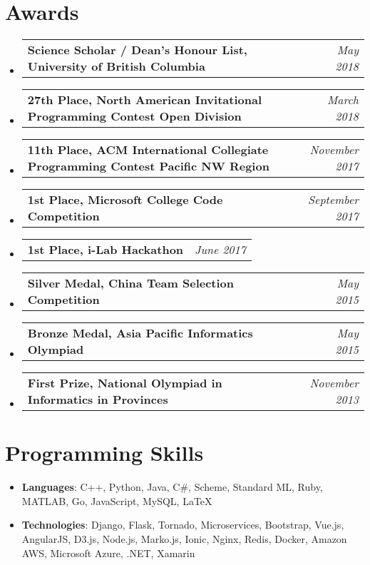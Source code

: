 \documentclass[letterpaper,11pt]{article}
\makeatletter
\newcommand{\resumeItem}[2]{
  \item\small{
    \textbf{#1}{: #2 \vspace{-2pt}}
  }
}
\newcommand{\awardSubItem}[2]{
  \item
    \begin{tabular*}{0.97\textwidth}{l@{\extracolsep{\fill}}r}
      \textbf{\small #1} & \textit{\small #2} \\
    \end{tabular*}\vspace{-8pt}
}
\newcommand{\resumeSubItem}[2]{\resumeItem{#1}{#2}\vspace{-4pt}}
\newcommand{\resumeSubHeadingListStart}{\begin{itemize}[leftmargin=*]}
\newcommand{\resumeSubHeadingListEnd}{\end{itemize}}
\makeatother
\begin{document}
\section{Awards}
  \resumeSubHeadingListStart
    \awardSubItem{Science Scholar / Dean's Honour List, University of British Columbia}{May 2018}
    \awardSubItem{27th Place, North American Invitational Programming Contest Open Division}{March 2018}
    \awardSubItem{11th Place, ACM International Collegiate Programming Contest Pacific NW Region}{November 2017}
    \awardSubItem{1st Place, Microsoft College Code Competition}{September 2017}
    \awardSubItem{1st Place, i-Lab Hackathon}{June 2017}
    \awardSubItem{Silver Medal, China Team Selection Competition}{May 2015}
    \awardSubItem{Bronze Medal, Asia Pacific Informatics Olympiad}{May 2015}
    \awardSubItem{First Prize, National Olympiad in Informatics in Provinces}{November 2013}
  \resumeSubHeadingListEnd

\section{Programming Skills}
  \resumeSubHeadingListStart
    \resumeSubItem{Languages}
      {C++, Python, Java, C\#, Scheme, Standard ML, Ruby, MATLAB, Go, JavaScript, MySQL, \LaTeX} \\
    \resumeSubItem{Technologies}
      {Django, Flask, Tornado, Microservices, Bootstrap, Vue.js, AngularJS, D3.js, Node.js, Marko.js, Ionic, Nginx, Redis, Docker, Amazon AWS, Microsoft Azure, .NET, Xamarin} \\
  \resumeSubHeadingListEnd


\end{document}
